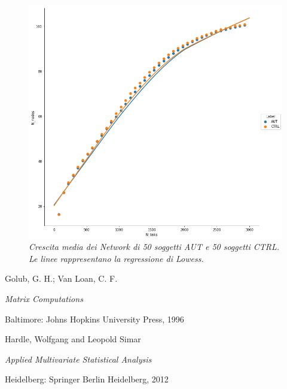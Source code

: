 \documentclass[12pt,openright,a4paper]{article}
\begin{document}
\begin{figure}[!h]
\centering
\includegraphics[scale=0.4]{ABIDE-Average-Lowess50}
\caption{\textit{Crescita media dei Network di 50 soggetti AUT e 50 soggetti CTRL. Le linee rappresentano la regressione di Lowess. }}
\label{ABIDE-Average}
\end{figure}

\clearpage

\begin{thebibliography}{99}

Golub, G. H.; Van Loan, C. F. 

\emph{Matrix Computations}

Baltimore: Johns Hopkins University Press, 1996

Hardle, Wolfgang and Leopold Simar

\emph{Applied Multivariate Statistical Analysis}

Heidelberg: Springer Berlin Heidelberg, 2012


\end{thebibliography}
\end{document}
